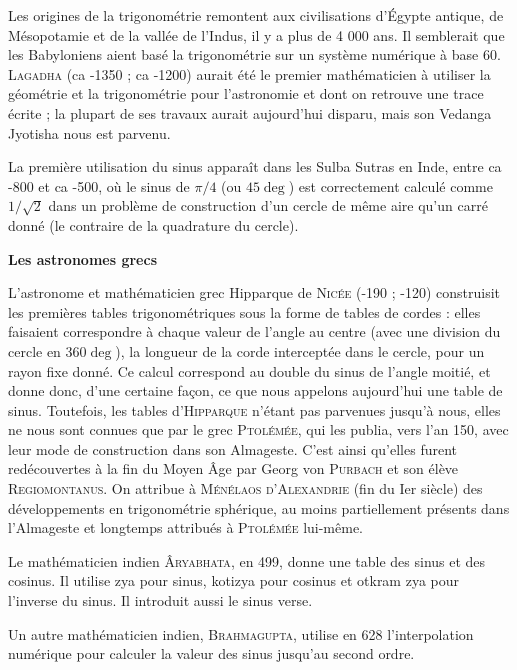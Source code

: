 
\begin{His}
Les origines de la trigonométrie remontent aux civilisations d’Égypte antique, de Mésopotamie et de la vallée de l’Indus, il y a plus de 4 000 ans. Il semblerait que les Babyloniens aient basé la trigonométrie sur un système numérique à base 60. \textsc{Lagadha} (ca -1350 ; ca -1200) aurait été le premier mathématicien à utiliser la géométrie et la trigonométrie pour l’astronomie et dont on retrouve une trace écrite ; la plupart de ses travaux aurait aujourd’hui disparu, mais son Vedanga Jyotisha nous est parvenu.

La première utilisation du sinus apparaît dans les Sulba Sutras en Inde, entre ca -800 et ca -500, où le sinus de $\pi/4$ (ou $45\deg$) est correctement calculé comme $1/\sqrt{2}$ dans un problème de construction d’un cercle de même aire qu’un carré donné (le contraire de la quadrature du cercle).

\vspace{0.4cm}

\textbf{Les astronomes grecs}

L'astronome et mathématicien grec Hipparque de \textsc{Nicée} (-190 ; -120) construisit les premières tables trigonométriques sous la forme de tables de cordes : elles faisaient correspondre à chaque valeur de l'angle au centre (avec une division du cercle en $360\deg$), la longueur de la corde interceptée dans le cercle, pour un rayon fixe donné. Ce calcul correspond au double du sinus de l'angle moitié, et donne donc, d'une certaine façon, ce que nous appelons aujourd'hui une table de sinus. Toutefois, les tables d'\textsc{Hipparque} n'étant pas parvenues jusqu'à nous, elles ne nous sont connues que par le grec \textsc{Ptolémée}, qui les publia, vers l'an 150, avec leur mode de construction dans son Almageste. C'est ainsi qu'elles furent redécouvertes à la fin du Moyen Âge par Georg von \textsc{Purbach} et son élève \textsc{Regiomontanus}. On attribue à \textsc{Ménélaos d'Alexandrie} (fin du Ier siècle) des développements en trigonométrie sphérique, au moins partiellement présents dans l'Almageste et longtemps attribués à \textsc{Ptolémée} lui-même.

Le mathématicien indien \textsc{Âryabhata}, en 499, donne une table des sinus et des cosinus. Il utilise zya pour sinus, kotizya pour cosinus et otkram zya pour l'inverse du sinus. Il introduit aussi le sinus verse.

Un autre mathématicien indien, \textsc{Brahmagupta}, utilise en 628 l'interpolation numérique pour calculer la valeur des sinus jusqu'au second ordre.


\end{His}
